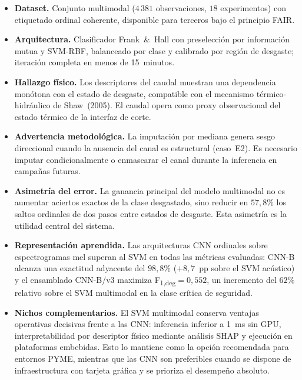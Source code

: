 \documentclass[12pt, letterpaper]{report}
\begin{document}
\begin{itemize}
\item \textbf{Dataset.} Conjunto multimodal ($4\,381$ observaciones,
      $18$ experimentos) con etiquetado ordinal coherente, disponible
      para terceros bajo el principio FAIR.
\item \textbf{Arquitectura.} Clasificador Frank~\&~Hall con preselección
      por información mutua y SVM-RBF, balanceado por clase y
      calibrado por región de desgaste; iteración completa en menos de
      15~minutos.
\item \textbf{Hallazgo físico.} Los descriptores del caudal muestran una
      dependencia monótona con el estado de desgaste, compatible con el
      mecanismo térmico-hidráulico de Shaw~(2005). El caudal opera como
      proxy observacional del estado térmico de la interfaz de corte.
\item \textbf{Advertencia metodológica.} La imputación por mediana
      genera sesgo direccional cuando la ausencia del canal es
      estructural (caso~E2). Es necesario imputar condicionalmente o
      enmascarar el canal durante la inferencia en campañas futuras.
\item \textbf{Asimetría del error.} La ganancia principal del modelo
      multimodal no es aumentar aciertos exactos de la clase
      desgastado, sino reducir en $57{,}8\%$ los saltos ordinales de
      dos pasos entre estados de desgaste. Esta asimetría es la
      utilidad central del sistema.
\item \textbf{Representación aprendida.} Las arquitecturas CNN
      ordinales sobre espectrogramas mel superan al SVM en todas las
      métricas evaluadas: CNN-B alcanza una exactitud adyacente del
      $98{,}8\%$ ($+8{,}7$~pp sobre el SVM acústico) y el ensamblado
      CNN-B/v3 maximiza F\textsubscript{1,deg}$=0{,}552$, un
      incremento del $62\%$ relativo sobre el SVM multimodal en la
      clase crítica de seguridad.
\item \textbf{Nichos complementarios.} El SVM multimodal conserva
      ventajas operativas decisivas frente a las CNN: inferencia
      inferior a 1~ms sin GPU, interpretabilidad por descriptor físico
      mediante análisis SHAP y ejecución en plataformas embebidas.
      Esto lo mantiene como la opción recomendada para entornos PYME,
      mientras que las CNN son preferibles cuando se dispone de
      infraestructura con tarjeta gráfica y se prioriza el desempeño
      absoluto.
\end{itemize}
\end{document}

